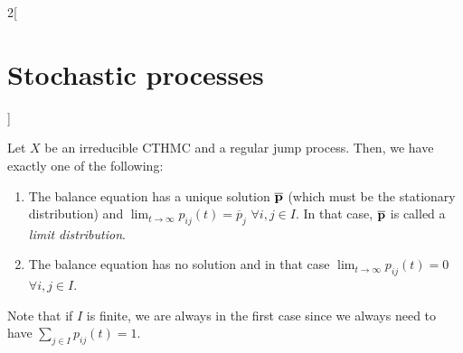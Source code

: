 \documentclass[../../../main_math.tex]{subfiles}
\begin{document}
\begin{multicols}{2}[\section{Stochastic processes}]
\begin{definition}
  \end{definition}
  \begin{theorem}\label{SP:limit_distribution}
    Let $X$ be an irreducible CTHMC and a regular jump process. Then, we have exactly one of the following:
    \begin{enumerate}
      \item The balance equation has a unique solution $\boldsymbol{\mathrm{\overline{p}}}$ (which must be the stationary distribution) and $\displaystyle \lim_{t\to\infty}p_{ij}(t)=\overline{p}_j$ $\forall i,j\in I$. In that case, $\boldsymbol{\mathrm{\overline{p}}}$ is called a \emph{limit distribution}.
      \item The balance equation has no solution and in that case $\displaystyle \lim_{t\to\infty}p_{ij}(t)=0$ $\forall i,j\in I$.
    \end{enumerate}
  \end{theorem}
  \begin{remark}
    Note that if $I$ is finite, we are always in the first case since we always need to have $\sum_{j\in I}p_{ij}(t)=1$.
  \end{remark}

\end{multicols}
\end{document}
